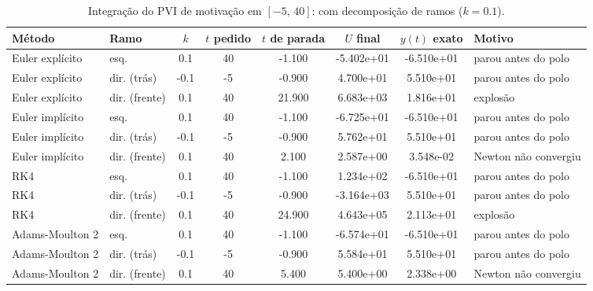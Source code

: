 \begin{table}[H]
    \centering
    \small
    \begin{tabular}{llcccccl}
        \hline
        Método & Ramo & $k$ & $t$ pedido & $t$ de parada & $U$ final & $y(t)$ exato & Motivo \\
        \hline
        Euler explícito & esq. & 0.1 & 40 & -1.100 & -5.402e+01 & -6.510e+01 & parou antes do polo \\
        Euler explícito & dir. (trás) & -0.1 & -5 & -0.900 & 4.700e+01 & 5.510e+01 & parou antes do polo \\
        Euler explícito & dir. (frente) & 0.1 & 40 & 21.900 & 6.683e+03 & 1.816e+01 & explosão \\
        Euler implícito & esq. & 0.1 & 40 & -1.100 & -6.725e+01 & -6.510e+01 & parou antes do polo \\
        Euler implícito & dir. (trás) & -0.1 & -5 & -0.900 & 5.762e+01 & 5.510e+01 & parou antes do polo \\
        Euler implícito & dir. (frente) & 0.1 & 40 & 2.100 & 2.587e+00 & 3.548e-02 & Newton não convergiu \\
        RK4 & esq. & 0.1 & 40 & -1.100 & 1.234e+02 & -6.510e+01 & parou antes do polo \\
        RK4 & dir. (trás) & -0.1 & -5 & -0.900 & -3.164e+03 & 5.510e+01 & parou antes do polo \\
        RK4 & dir. (frente) & 0.1 & 40 & 24.900 & 4.643e+05 & 2.113e+01 & explosão \\
        Adams-Moulton 2 & esq. & 0.1 & 40 & -1.100 & -6.574e+01 & -6.510e+01 & parou antes do polo \\
        Adams-Moulton 2 & dir. (trás) & -0.1 & -5 & -0.900 & 5.584e+01 & 5.510e+01 & parou antes do polo \\
        Adams-Moulton 2 & dir. (frente) & 0.1 & 40 & 5.400 & 5.400e+00 & 2.338e+00 & Newton não convergiu \\
        \hline
    \end{tabular}
    \caption{Integração do PVI de motivação em $[-5,\, 40]$: com decomposição de ramos ($k = 0.1$).}
    \label{tab:m5_40_cd}
\end{table}
